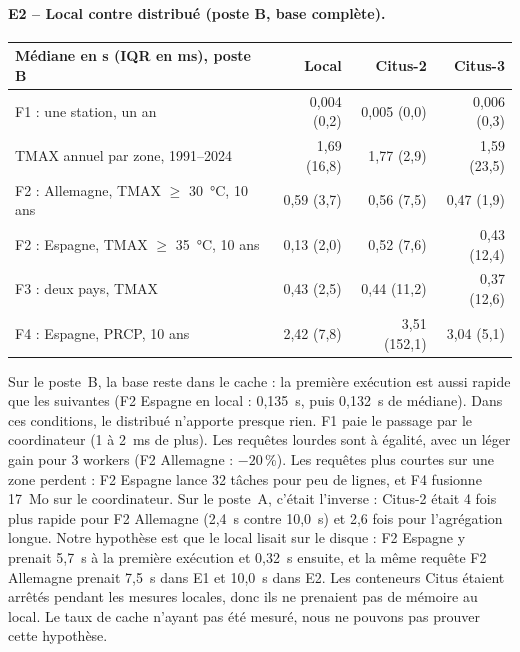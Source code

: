 \documentclass{rapportClass}
\begin{document}
\paragraph{E2 -- Local contre distribué (poste B, base complète).}
\begin{table}[H]
\centering\small
\begin{tabular}{lrrr}
\toprule
Médiane en s (IQR en ms), poste B & Local & Citus-2 & Citus-3 \\
\midrule
F1 : une station, un an & 0,004 (0,2) & 0,005 (0,0) & 0,006 (0,3) \\
TMAX annuel par zone, 1991--2024 & 1,69 (16,8) & 1,77 (2,9) & 1,59 (23,5) \\
F2 : Allemagne, TMAX $\ge$ 30~°C, 10 ans & 0,59 (3,7) & 0,56 (7,5) & 0,47 (1,9) \\
F2 : Espagne, TMAX $\ge$ 35~°C, 10 ans & 0,13 (2,0) & 0,52 (7,6) & 0,43 (12,4) \\
F3 : deux pays, TMAX & 0,43 (2,5) & 0,44 (11,2) & 0,37 (12,6) \\
F4 : Espagne, PRCP, 10 ans & 2,42 (7,8) & 3,51 (152,1) & 3,04 (5,1) \\
\bottomrule
\end{tabular}
\end{table}
Sur le poste~B, la base reste dans le cache : la première exécution est aussi rapide que les suivantes
(F2 Espagne en local : 0,135~s, puis 0,132~s de médiane). Dans ces conditions, le distribué n'apporte presque rien.
F1 paie le passage par le coordinateur (1 à 2~ms de plus). Les requêtes lourdes sont à égalité, avec un léger
gain pour 3 workers (F2 Allemagne : $-20$\,\%). Les requêtes plus courtes sur une zone perdent : F2 Espagne lance
32 tâches pour peu de lignes, et F4 fusionne 17~Mo sur le coordinateur.
Sur le poste~A, c'était l'inverse : Citus-2 était 4 fois plus rapide pour F2 Allemagne (2,4~s contre 10,0~s) et
2,6 fois pour l'agrégation longue. Notre hypothèse est
que le local lisait sur le disque : F2 Espagne y prenait 5,7~s à la première exécution et 0,32~s ensuite, et la
même requête F2 Allemagne prenait 7,5~s dans E1 et 10,0~s dans E2. Les conteneurs Citus étaient arrêtés pendant
les mesures locales, donc ils ne prenaient pas de mémoire au local. Le taux de cache n'ayant pas été mesuré, nous
ne pouvons pas prouver cette hypothèse.
\end{document}

